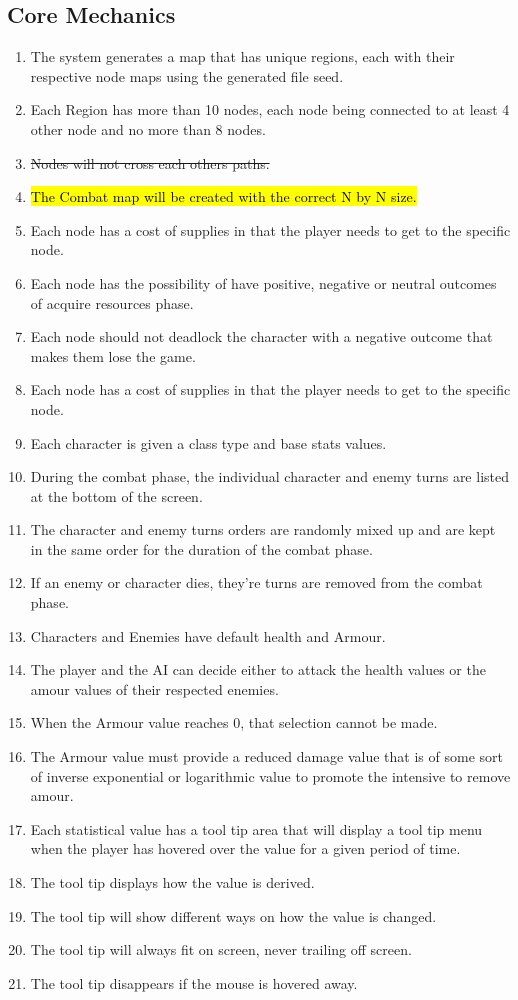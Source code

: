 \documentclass{article}
\begin{document}
\subsection{Core Mechanics}
\begin{enumerate}[{CMR}1. ]
	\item The system generates a map that has unique regions, each with their respective node maps using the generated file seed.
	\item Each Region has more than 10 nodes, each node being connected to at least 4 other node and no more than 8 nodes.
	\item \st{Nodes will not cross each others paths.}
	\item \hl{The Combat map will be created with the correct N by N size.}
	\item Each node has a cost of supplies in that the player needs to get to the specific node.
	\item Each node has the possibility of have positive, negative or neutral outcomes of acquire resources phase.
	\item Each node should not deadlock the character with a negative outcome that makes them lose the game.
	\item Each node has a cost of supplies in that the player needs to get to the specific node.
	\item Each character is given a class type and base stats values.
	\item During the combat phase, the individual character and enemy turns are listed at the bottom of the screen.
	\item The character and enemy turns orders are randomly mixed up and are kept in the same order for the duration of the combat phase.
	\item If an enemy or character dies, they're turns are removed from the combat phase.
	\item Characters and Enemies have default health and Armour.
	\item The player and the AI can decide either to attack the health values or the amour values of their respected enemies.
	\item When the Armour value reaches 0, that selection cannot be made.
	\item The Armour value must provide a reduced damage value that is of some sort of inverse exponential or logarithmic value to promote the intensive to remove amour.
	\item Each statistical value has a tool tip area that will display a tool tip menu when the player has hovered over the value for a given period of time.
	\item The tool tip displays how the value is derived.
	\item The tool tip will show different ways on how the value is changed.
	\item The tool tip will always fit on screen, never trailing off screen.
	\item The tool tip disappears if the mouse is hovered away.
\end{enumerate}
\end{document}
